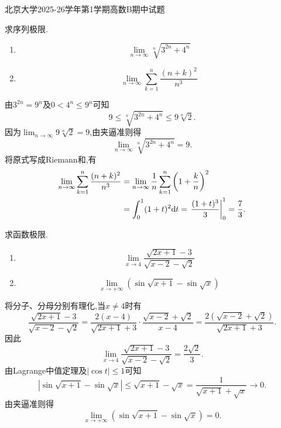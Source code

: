 \documentclass{ctexart}
\begin{document}
\pagestyle{empty}
\begin{center}\Large
北京大学2025-26学年第1学期高数B期中试题
\end{center}

\begin{problem}[1.(10\songti{分})]
求序列极限.
\begin{enumerate}[label=\tbf{(\alph*)},leftmargin=*,topsep=0pt,parsep=0pt,itemsep=0pt,partopsep=0pt]
\item \[\lim_{n\to\infty}\sqrt[n]{3^{2n}+4^n}\]
\item \[\lim_{n\to\infty}\sum_{k=1}^n\dfrac{(n+k)^2}{n^3}\]
\end{enumerate}
\end{problem}
\begin{solution}
 由$3^{2n}=9^n$及$0<4^n\leqslant9^n$可知
\[
9\leqslant\sqrt[n]{3^{2n}+4^n}\leqslant9\sqrt[n]{2}.
\]
因为$\displaystyle\lim_{n\to\infty}9\sqrt[n]{2}=9$,由夹逼准则得
\[
{\lim_{n\to\infty}\sqrt[n]{3^{2n}+4^n}=9.}
\]
 将原式写成Riemann和,有
\[
\begin{aligned}
\lim_{n\to\infty}\sum_{k=1}^n\dfrac{(n+k)^2}{n^3}
&=\lim_{n\to\infty}\dfrac1n\sum_{k=1}^n\left(1+\dfrac{k}{n}\right)^2\\
&=\int_0^1(1+t)^2\mathrm{d} t
=\left.\dfrac{(1+t)^3}{3}\right|_0^1
={\dfrac73}.
\end{aligned}
\]
\end{solution}

\begin{problem}[2.(10\songti{分})]
求函数极限.
\begin{enumerate}[label=\tbf{(\alph*)},leftmargin=*,topsep=0pt,parsep=0pt,itemsep=0pt,partopsep=0pt]
\item \[\lim_{x\to4}\dfrac{\sqrt{2x+1}-3}{\sqrt{x-2}-\sqrt2}\]
\item \[\lim_{x\to+\infty}\left(\sin\sqrt{x+1}-\sin\sqrt x\right)\]
\end{enumerate}
\end{problem}
\begin{solution}
 将分子、分母分别有理化,当$x\ne4$时有
\[
\dfrac{\sqrt{2x+1}-3}{\sqrt{x-2}-\sqrt2}
=\dfrac{2(x-4)}{\sqrt{2x+1}+3}\cdot
\dfrac{\sqrt{x-2}+\sqrt2}{x-4}
=\dfrac{2(\sqrt{x-2}+\sqrt2)}{\sqrt{2x+1}+3}.
\]
因此
\[
{\lim_{x\to4}\dfrac{\sqrt{2x+1}-3}{\sqrt{x-2}-\sqrt2}
=\dfrac{2\sqrt2}{3}.}
\]
 由Lagrange中值定理及$|\cos t|\leqslant1$可知
\[
\left|\sin\sqrt{x+1}-\sin\sqrt x\right|
\leqslant\sqrt{x+1}-\sqrt x
=\dfrac1{\sqrt{x+1}+\sqrt x}\longrightarrow0.
\]
由夹逼准则得
\[
{\lim_{x\to+\infty}\left(\sin\sqrt{x+1}-\sin\sqrt x\right)=0.}
\]
\end{solution}
\end{document}
